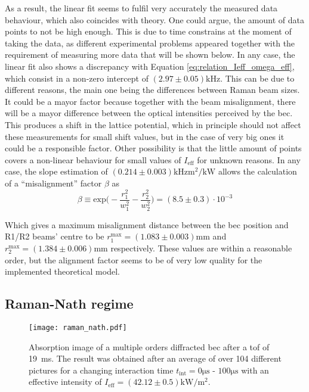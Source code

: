 As a result, the linear fit seems to fulfil very accurately the measured data behaviour, which also coincides with theory. One could argue, the amount of data points to not be high enough. This is due to time constrains at the moment of taking the data, as different experimental problems appeared together with the requirement of measuring more data that will be shown below. In any case, the linear fit also shows a discrepancy with Equation \eqref{eq:relation_Ieff_omega_eff}, which consist in a non-zero intercept of $(2.97\pm0.05)\si{\kilo\hertz}$. This can be due to different reasons, the main one being the differences between Raman beam sizes. It could be a mayor factor because together with the beam misalignment, there will be a mayor difference between the optical intensities perceived by the \ac{bec}. This produces a shift in the lattice potential, which in principle should not affect these measurements for small shift values, but in the case of very big ones it could be a responsible factor. Other possibility is that the little amount of points covers a non-linear behaviour for small values of $I_\text{eff}$ for unknown reasons. In any case, the slope estimation of $(0.214\pm0.003)\si{\kilo\hertz\meter\squared\per\kilo\watt}$ allows the calculation of a ``misalignment'' factor $\beta$ as
\begin{equation*}
	\beta \equiv \text{exp}\bigg(-\frac{r_1^2}{w_1^2}-\frac{r_2^2}{w_2^2}\bigg) = (8.5\pm0.3)\cdot10^{-3}
\end{equation*}

Which gives a maximum misalignment distance between the \ac{bec} position and R1/R2 beams' centre to be $r_1^\text{max} = (1.083 \pm 0.003) \si{\milli\meter}$ and  $r_2^\text{max} = (1.384\pm0.006) \si{\milli\meter}$ respectively. These values are within a reasonable order, but the alignment factor seems to be of very low quality for the implemented theoretical model.

\pagebreak

\subsection{Raman-Nath regime}



\begin{figure}[!htbp]\centering
	\texttt{[image: raman\_nath.pdf]}
	\caption[Absorption image of a multiple orders diffracted \ac{bec} after a \ac{tof} of \SI{19}{\milli\second}]{Absorption image of a multiple orders diffracted \ac{bec} after a \ac{tof} of \SI{19}{\milli\second}. The result was obtained after an average of over 104 different pictures for a changing interaction time $t_\text{int} = 0\si{\micro\second}\text{ - }100\si{\micro\second}$ with an effective intensity of $I_\text{eff} = (42.12 \pm 0.5)\si{\kilo\watt\per\meter\squared}$.}\label{fig:raman_nath}
\end{figure}

